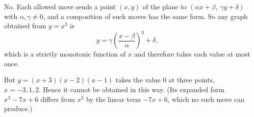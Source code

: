 No. Each allowed move sends a point $(x,y)$ of the plane to $(\alpha x+\beta,\ \gamma y+\delta)$ with $\alpha,\gamma\ne0$, and a composition of such moves has the same form. So any graph obtained from $y=x^3$ is
\[y=\gamma\left(\dfrac{x-\beta}{\alpha}\right)^3+\delta,\]
which is a strictly monotonic function of $x$ and therefore takes each value at most once.

But $y=(x+3)(x-2)(x-1)$ takes the value $0$ at three points, $x=-3,1,2$. Hence it cannot be obtained in this way. (Its expanded form $x^3-7x+6$ differs from $x^3$ by the linear term $-7x+6$, which no such move can produce.)
